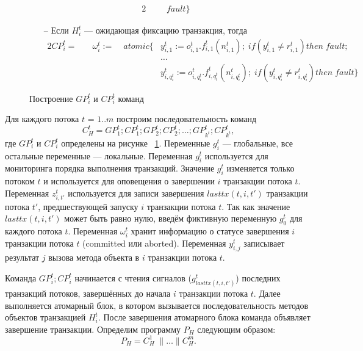 \begin{myproof}
\begin{figure}
\begin{itemize}
\begin{alignat}{2}
         &           &&fault \} \nonumber
\end{alignat}
\item[--] Если $H^t_{i}$ --- ожидающая фиксацию транзакция, тогда 
\begin{alignat}{2}
     CP^t_i =&\quad \omega^t_{i} := &\; atomic\{&y^t_{i,1} := o^t_{i,1}.f^t_{i,1}(n^t_{i,1}); \; if \left (y^t_{i,1} \neq r^t_{i,1}\right) then \; fault; \nonumber \\
         &           &&\ldots \nonumber \\
         &           &&y^t_{i,q^t_i} := o^t_{i,q^t_i}.f^t_{i,q^t_i}(n^t_{i,q^t_i}); \; if \left (y^t_{i,q^t_i} \neq r^t_{i,q^t_i}\right) then \; fault\} \nonumber
\end{alignat}
\end{itemize}
\caption{Построение $GP^t_i$ и $CP^t_i$ команд}
\label{fig:commands}
\end{figure}
Для каждого потока $t$ = $1..m$ построим последовательность команд $$C^t_H = GP^t_1;CP^t_1;GP^t_2;CP^t_2;\ldots;GP^t_{k^t};CP^t_{k^t},$$ где $GP^t_i$ и $CP^t_i$ определены на рисунке ~\ref{fig:commands}.
Переменные $g^t_i$ --- глобальные, все остальные переменные --- локальные. Переменная $g^t_i$ используется для мониторинга порядка выполнения транзакций. Значение $g^t_i$ изменяется только потоком $t$ и используется для оповещения о завершении $i$ транзакции потока $t$. Переменная $z^t_{i,t'}$ используется для записи завершения $lasttx(t, i, t')$ транзакции потока $t'$, предшествующей запуску $i$ транзакции потока $t$. Так как значение $lasttx(t, i, t')$ может быть равно нулю, введём фиктивную переменную $g^t_0$ для каждого потока $t$. Переменная $\omega^t_i$ хранит информацию о статусе завершения $i$ транзакции потока $t$ (committed или aborted). Переменная $y^t_{i,j}$ записывает результат $j$ вызова метода объекта в $i$ транзакции потока $t$. 

Команда $GP^t_i;CP^t_i$ начинается с чтения сигналов ($g^t_{lasttx(t,i,t')}$) последних транзакций потоков, завершённых до начала $i$ транзакции потока $t$. Далее выполняется атомарный блок, в котором вызывается последовательность методов объектов транзакцией $H^t_i$. После завершения атомарного блока команда объявляет завершение транзакции. Определим программу $P_H$ следующим образом: $$P_H = C^1_H \; \parallel \ldots \parallel C^m_H.$$


\end{myproof}
